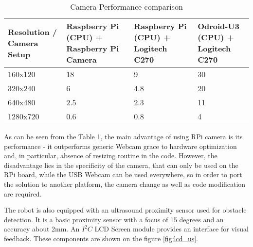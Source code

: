 \begin{table}[h!]
	\setlength\extrarowheight{2pt}
	\setlength\arraycolsep{5pt}
    \begin{tabularx}{\textwidth}{XXXX}
    	\toprule
    	\bf
	    Resolution / Camera Setup & \bf Raspberry Pi (CPU) + Raspberry Pi Camera & \bf 
	    Raspberry Pi (CPU) + Logitech C270 & \bf  Odroid-U3 (CPU) + Logitech C270 \\
	    \hline
	    160x120            & 18           & 9          & 30         \\
	    320x240            & 6            & 4.8        & 20         \\
	    640x480            & 2.5          & 2.3        & 11         \\
	    1280x720           & 0.6          & 0.8        & 4          \\
	    \bottomrule
    \end{tabularx}
    \caption{Camera Performance comparison}
    \label{tab:cam_perf}
\end{table}

As can be seen from the Table \ref{tab:cam_perf}, the main advantage of using
RPi camera is its performance - it outperforms generic Webcam grace to hardware
optimization and, in particular, absence of resizing routine in the code.
However, the disadvantage lies in the specificity of the camera, that can only
be used on the RPi board, while the USB Webcam can be used everywhere, so in
order to port the solution to another platform, the camera change as well as
 code modification are required.

The robot is also equipped with an ultrasound proximity sensor used for obstacle
detection. It is a basic proximity sensor with a focus of 15 degrees and an
accuracy about 2mm. An $I^2C$ LCD Screen module provides an interface for visual feedback.
These components are shown on the figure \ref{fig:lcd_us}.